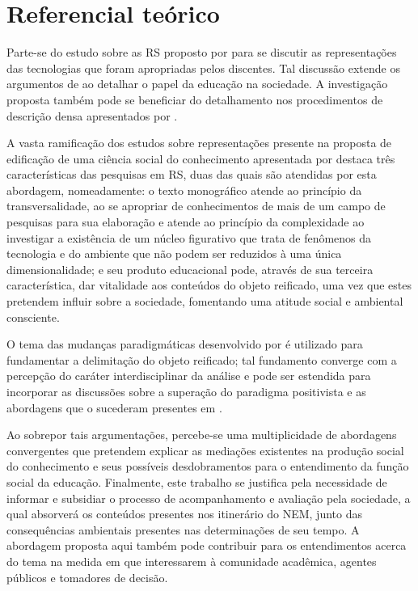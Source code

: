 \documentclass[
  12pt,       %
  openright,      %
  twoside,      %
  a4paper,      %
  english,      %
  french,       %
  spanish,      %
  brazil        %
  ]{abntex2}
\begin{document}
\chapter{Referencial teórico}

Parte-se do estudo sobre as RS proposto por  para se discutir as representações das tecnologias que foram apropriadas pelos discentes. Tal discussão extende os argumentos de  ao detalhar o papel da educação na sociedade. A investigação proposta também pode se beneficiar do detalhamento nos procedimentos de descrição densa apresentados por .

A vasta ramificação dos estudos sobre representações presente na proposta de edificação de uma ciência social do conhecimento apresentada por  destaca três características das pesquisas em RS, duas das quais são atendidas por esta abordagem, nomeadamente: o texto monográfico atende ao princípio da transversalidade, ao se apropriar de conhecimentos de mais de um campo de pesquisas para sua elaboração e atende ao princípio da complexidade ao investigar a existência de um núcleo figurativo que trata de fenômenos da tecnologia e do ambiente que não podem ser reduzidos à uma única dimensionalidade; e seu produto educacional pode, através de sua terceira característica, dar vitalidade aos conteúdos do objeto reificado, uma vez que estes pretendem influir sobre a sociedade, fomentando uma atitude social e ambiental consciente.

O tema das mudanças paradigmáticas desenvolvido por  é utilizado para fundamentar a delimitação do objeto reificado; tal fundamento converge com a percepção do caráter interdisciplinar da análise e pode ser estendida para incorporar as discussões sobre a superação do paradigma positivista e as abordagens que o sucederam presentes em .

Ao sobrepor tais argumentações, percebe-se uma multiplicidade de abordagens convergentes que pretendem explicar as mediações existentes na produção social do conhecimento e seus possíveis desdobramentos para o entendimento da função social da educação.
Finalmente, este trabalho se justifica pela necessidade de informar e subsidiar o processo de acompanhamento e avaliação pela sociedade, a qual absorverá os conteúdos presentes nos itinerário do NEM, junto das consequências ambientais presentes nas determinações de seu tempo. A abordagem proposta aqui também pode contribuir para os entendimentos acerca do tema na medida em que interessarem à comunidade acadêmica, agentes públicos e tomadores de decisão.
\end{document}
